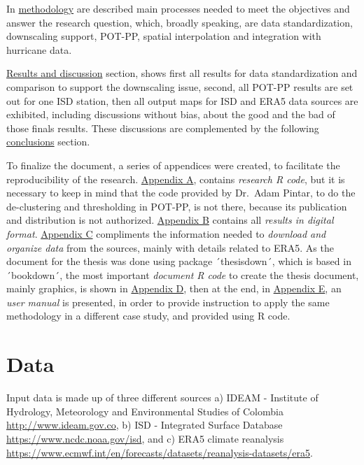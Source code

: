\documentclass[12pt,oneside]{reedthesis}
\begin{document}
In \protect\hyperlink{rmd-method}{methodology} are described main processes needed to meet the objectives and answer the research question, which, broadly speaking, are data standardization, downscaling support, POT-PP, spatial interpolation and integration with hurricane data.

\protect\hyperlink{rmd-results}{Results and discussion} section, shows first all results for data standardization and comparison to support the downscaling issue, second, all POT-PP results are set out for one ISD station, then all output maps for ISD and ERA5 data sources are exhibited, including discussions without bias, about the good and the bad of those finals results. These discussions are complemented by the following \protect\hyperlink{conclusions}{conclusions} section.

To finalize the document, a series of appendices were created, to facilitate the reproducibility of the research. \protect\hyperlink{rcode}{Appendix A}, contains \emph{research R code}, but it is necessary to keep in mind that the code provided by Dr.~Adam Pintar, to do the de-clustering and thresholding in POT-PP, is not there, because its publication and distribution is not authorized. \protect\hyperlink{results}{Appendix B} contains all \emph{results in digital format}. \protect\hyperlink{era5download}{Appendix C} compliments the information needed to \emph{download and organize data} from the sources, mainly with details related to ERA5. As the document for the thesis was done using package ´thesisdown´, which is based in ´bookdown´, the most important \emph{document R code} to create the thesis document, mainly graphics, is shown in \protect\hyperlink{docrcode}{Appendix D}, then at the end, in \protect\hyperlink{manual}{Appendix E}, an \emph{user manual} is presented, in order to provide instruction to apply the same methodology in a different case study, and provided using R code.

\hypertarget{rmd-data}{%
\chapter{Data}\label{rmd-data}}

Input data is made up of three different sources a) IDEAM - Institute of Hydrology, Meteorology and Environmental Studies of Colombia \url{http://www.ideam.gov.co}, b) ISD - Integrated Surface Database \url{https://www.ncdc.noaa.gov/isd}, and c) ERA5 climate reanalysis \url{https://www.ecmwf.int/en/forecasts/datasets/reanalysis-datasets/era5}.
\end{document}
